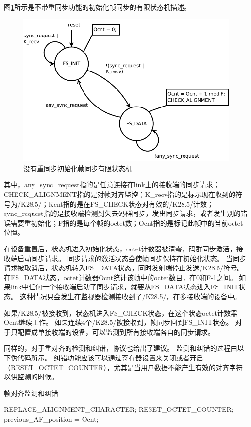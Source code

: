 \documentclass[UTF8]{ctexart}
\begin{document}
图\ref{fig:ifs_fsm_non_resync}所示是不带重同步功能的初始化帧同步的有限状态机描述。
\begin{figure}[H]
	\centering
	\includegraphics[width=16cm]{./img/ifs_fsm_non_resync.pdf}
	\caption{没有重同步初始化帧同步有限状态机}
	\label{fig:ifs_fsm_non_resync}
\end{figure}

其中，any\_sync\_request指的是任意连接在link上的接收端的同步请求；CHECK\_ALIGNMENT指的是对帧对齐监控；K\_recv指的是标示现在收到的符号为/K28.5/；Kcnt指的是在FS\_CHECK状态对有效的/K28.5/计数；sync\_request指的是接收端检测到失去码群同步，发出同步请求，或者发生别的错误需要重初始化；F指的是每个帧的octet数；Ocnt指的是标记此帧中的当前octet位置。

在设备重置后，状态机进入初始化状态，octet计数器被清零，码群同步激活，接收端启动同步请求。
同步请求的激活状态会使帧同步保持在初始化状态。
当同步请求被取消后，状态机转入FS\_DATA状态，同时发射端停止发送/K28.5/符号。
在FS\_DATA状态，octet计数器Ocnt统计该帧中的octet数目，在0和F-1之间。
如果link中任何一个接收端启动了同步请求，就要从FS\_DATA状态进入FS\_INIT状态。
这种情况只会发生在监视器检测接收到了/K28.5/，在多接收端的设备中。

如果/K28.5/被接收到，状态机进入FS\_CHECK状态，在这个状态octet计数器Ocnt继续工作。
如果连续4个/K28.5/被接收到，帧同步回到FS\_INIT状态。
对于只配置成单接收端的设备，可以监测到所有接收端各自的同步请求。

同样的，对于重对齐的检测和纠错，协议也给出了建议。
监测和纠错的过程由以下伪代码所示。
纠错功能应该可以通过寄存器设置来关闭或者开启（RESET\_OCTET\_COUNTER），尤其是当用户数据不能产生有效的对齐字符以供监测的时候。

\begin{algorithm}[H]
	\caption{帧对齐监测和纠错}
    \begin{algorithmic}[1]
    		\State REPLACE\_ALIGNMENT\_CHARACTER;
    			\State RESET\_OCTET\_COUNTER;
    		\EndIf
    			\State previous\_AF\_position = Ocnt;
    		\EndIf
    	\EndIf
    \end{algorithmic}
\end{algorithm}
\end{document}
